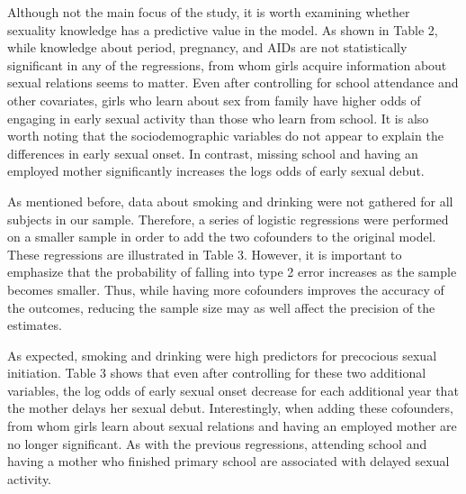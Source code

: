 \documentclass[
]{article}
\begin{document}
Although not the main focus of the study, it is worth examining whether
sexuality knowledge has a predictive value in the model. As shown in
Table 2, while knowledge about period, pregnancy, and AIDs are not
statistically significant in any of the regressions, from whom girls
acquire information about sexual relations seems to matter. Even after
controlling for school attendance and other covariates, girls who learn
about sex from family have higher odds of engaging in early sexual
activity than those who learn from school. It is also worth noting that
the sociodemographic variables do not appear to explain the differences
in early sexual onset. In contrast, missing school and having an
employed mother significantly increases the logs odds of early sexual
debut.

As mentioned before, data about smoking and drinking were not gathered
for all subjects in our sample. Therefore, a series of logistic
regressions were performed on a smaller sample in order to add the two
cofounders to the original model. These regressions are illustrated in
Table 3. However, it is important to emphasize that the probability of
falling into type 2 error increases as the sample becomes smaller. Thus,
while having more cofounders improves the accuracy of the outcomes,
reducing the sample size may as well affect the precision of the
estimates.

As expected, smoking and drinking were high predictors for precocious
sexual initiation. Table 3 shows that even after controlling for these
two additional variables, the log odds of early sexual onset decrease
for each additional year that the mother delays her sexual debut.
Interestingly, when adding these cofounders, from whom girls learn about
sexual relations and having an employed mother are no longer
significant. As with the previous regressions, attending school and
having a mother who finished primary school are associated with delayed
sexual activity.
\end{document}
